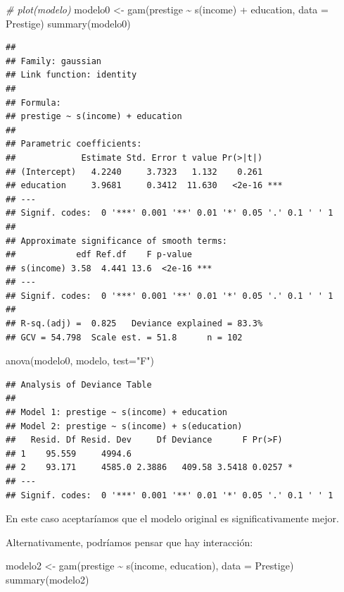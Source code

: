 \documentclass[
]{book}
\newenvironment{Shaded}{\begin{snugshade}}{\end{snugshade}}
\newcommand{\AttributeTok}[1]{\textcolor[rgb]{0.77,0.63,0.00}{#1}}
\newcommand{\CommentTok}[1]{\textcolor[rgb]{0.56,0.35,0.01}{\textit{#1}}}
\newcommand{\FunctionTok}[1]{\textcolor[rgb]{0.00,0.00,0.00}{#1}}
\newcommand{\NormalTok}[1]{#1}
\newcommand{\OtherTok}[1]{\textcolor[rgb]{0.56,0.35,0.01}{#1}}
\newcommand{\SpecialCharTok}[1]{\textcolor[rgb]{0.00,0.00,0.00}{#1}}
\newcommand{\StringTok}[1]{\textcolor[rgb]{0.31,0.60,0.02}{#1}}
\theoremstyle{break}
\theoremstyle{nonumberplain}
\begin{document}
\begin{Shaded}
\begin{Highlighting}[]
\CommentTok{\# plot(modelo)}
\NormalTok{modelo0 }\OtherTok{\textless{}{-}} \FunctionTok{gam}\NormalTok{(prestige }\SpecialCharTok{\textasciitilde{}} \FunctionTok{s}\NormalTok{(income) }\SpecialCharTok{+}\NormalTok{ education, }\AttributeTok{data =}\NormalTok{ Prestige)}
\FunctionTok{summary}\NormalTok{(modelo0)}
\end{Highlighting}
\end{Shaded}

\begin{verbatim}
## 
## Family: gaussian 
## Link function: identity 
## 
## Formula:
## prestige ~ s(income) + education
## 
## Parametric coefficients:
##             Estimate Std. Error t value Pr(>|t|)    
## (Intercept)   4.2240     3.7323   1.132    0.261    
## education     3.9681     0.3412  11.630   <2e-16 ***
## ---
## Signif. codes:  0 '***' 0.001 '**' 0.01 '*' 0.05 '.' 0.1 ' ' 1
## 
## Approximate significance of smooth terms:
##            edf Ref.df    F p-value    
## s(income) 3.58  4.441 13.6  <2e-16 ***
## ---
## Signif. codes:  0 '***' 0.001 '**' 0.01 '*' 0.05 '.' 0.1 ' ' 1
## 
## R-sq.(adj) =  0.825   Deviance explained = 83.3%
## GCV = 54.798  Scale est. = 51.8      n = 102
\end{verbatim}

\begin{Shaded}
\begin{Highlighting}[]
\FunctionTok{anova}\NormalTok{(modelo0, modelo, }\AttributeTok{test=}\StringTok{"F"}\NormalTok{)}
\end{Highlighting}
\end{Shaded}

\begin{verbatim}
## Analysis of Deviance Table
## 
## Model 1: prestige ~ s(income) + education
## Model 2: prestige ~ s(income) + s(education)
##   Resid. Df Resid. Dev     Df Deviance      F Pr(>F)  
## 1    95.559     4994.6                                
## 2    93.171     4585.0 2.3886   409.58 3.5418 0.0257 *
## ---
## Signif. codes:  0 '***' 0.001 '**' 0.01 '*' 0.05 '.' 0.1 ' ' 1
\end{verbatim}

En este caso aceptaríamos que el modelo original es significativamente mejor.

Alternativamente, podríamos pensar que hay interacción:

\begin{Shaded}
\begin{Highlighting}[]
\NormalTok{modelo2 }\OtherTok{\textless{}{-}} \FunctionTok{gam}\NormalTok{(prestige }\SpecialCharTok{\textasciitilde{}} \FunctionTok{s}\NormalTok{(income, education), }\AttributeTok{data =}\NormalTok{ Prestige)}
\FunctionTok{summary}\NormalTok{(modelo2)}
\end{Highlighting}
\end{Shaded}
\end{document}
